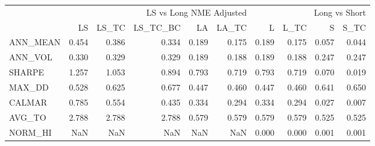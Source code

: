 \begin{tabular}{lrrrrrrrrr}
\toprule
 & \multicolumn{5}{r}{LS vs Long NME Adjusted} & \multicolumn{4}{r}{Long vs Short} \\
 & LS & LS\_TC & LS\_TC\_BC & LA & LA\_TC & L & L\_TC & S & S\_TC \\
\midrule
ANN\_MEAN & 0.454 & 0.386 & 0.334 & 0.189 & 0.175 & 0.189 & 0.175 & 0.057 & 0.044 \\
ANN\_VOL & 0.330 & 0.329 & 0.329 & 0.189 & 0.188 & 0.189 & 0.188 & 0.247 & 0.247 \\
SHARPE & 1.257 & 1.053 & 0.894 & 0.793 & 0.719 & 0.793 & 0.719 & 0.070 & 0.019 \\
MAX\_DD & 0.528 & 0.625 & 0.677 & 0.447 & 0.460 & 0.447 & 0.460 & 0.641 & 0.650 \\
CALMAR & 0.785 & 0.554 & 0.435 & 0.334 & 0.294 & 0.334 & 0.294 & 0.027 & 0.007 \\
AVG\_TO & 2.788 & 2.788 & 2.788 & 0.579 & 0.579 & 0.579 & 0.579 & 0.525 & 0.525 \\
NORM\_HI & NaN & NaN & NaN & NaN & NaN & 0.000 & 0.000 & 0.001 & 0.001 \\
\bottomrule
\end{tabular}
